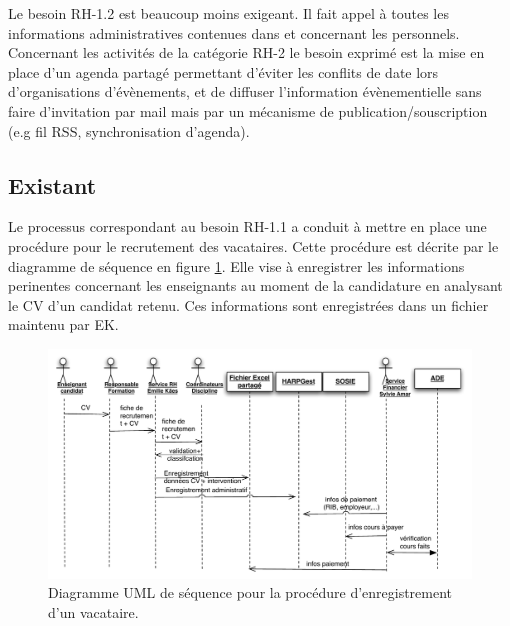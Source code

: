 \documentclass{book}
\begin{document}
Le  besoin RH-1.2  est  beaucoup moins  exigeant.  Il fait  appel  à toutes  les
informations administratives  contenues dans   et 
concernant les personnels.\\


Concernant les activités de  la catégorie RH-2 le besoin exprimé  est la mise en
place  d'un  agenda  partagé  permettant  d'éviter les  conflits  de  date  lors
d'organisations d'évènements,  et de diffuser l'information  évènementielle sans
faire d'invitation  par mail mais  par un mécanisme  de publication/souscription
(e.g fil RSS, synchronisation d'agenda).



\subsection{Existant}

Le processus  correspondant au  besoin RH-1.1  a conduit à  mettre en  place une
procédure pour le recrutement des vacataires. Cette procédure est décrite par le
diagramme  de  séquence  en  figure  \ref{fg:rh_seq_vacataires}.   Elle  vise  à
enregistrer les informations perinentes concernant  les enseignants au moment de
la candidature  en analysant le CV  d'un candidat retenu. Ces  informations sont
enregistrées dans un fichier  maintenu par EK.

\begin{figure}[hbt]
\begin{center}
\includegraphics[width=\linewidth]{figs/rh_seq_vacataires.pdf}
\end{center}
\caption{Diagramme UML de séquence pour la procédure d'enregistrement d'un vacataire.}
\label{fg:rh_seq_vacataires}
\end{figure}
\end{document}
